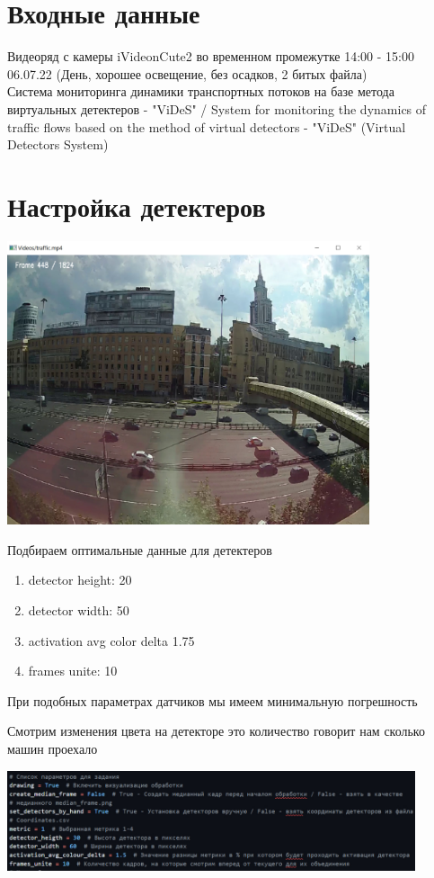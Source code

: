 \documentclass[a4paper,12pt]{article}
\begin{document}

\tableofcontents
\newpage
\section*{Входные данные}
Видеоряд с камеры iVideonCute2 во временном промежутке 14:00 - 15:00 06.07.22
(День, хорошее освещение, без осадков, 2 битых файла)\\
Система мониторинга динамики транспортных потоков на базе метода виртуальных детектеров
- "ViDeS" / System for monitoring the dynamics of traffic flows based on
the method of virtual detectors - "ViDeS" (Virtual Detectors System)


\section*{Настройка детектеров}
\includegraphics[width=0.8\textwidth]{detector_settings.jpg}
\begin{center}
Подбираем оптимальные данные для детектеров
\end{center}
\begin{enumerate}
    \item detector height: 20
    \item detector width: 50
    \item activation avg color delta 1.75
    \item frames unite: 10
\end{enumerate}
\begin{center}
При подобных параметрах датчиков мы имеем минимальную погрешность
\end{center}
Смотрим изменения цвета на детекторе это количество говорит нам сколько машин проехало
\begin{center}
\includegraphics[width=0.9\textwidth]{detector_code.jpg}
\end{center}
\end{document}
